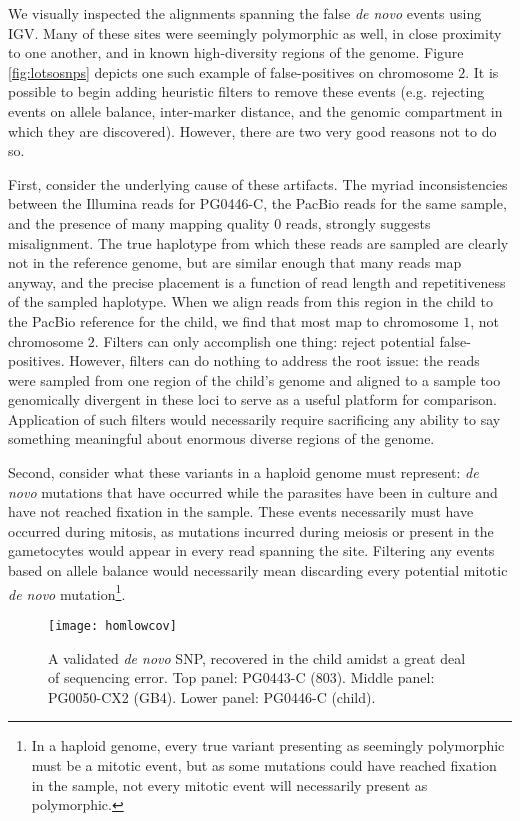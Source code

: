 We visually inspected the alignments spanning the false \textit{de novo} events using IGV.  Many of these sites were seemingly polymorphic as well, in close proximity to one another, and in known high-diversity regions of the genome.  Figure \ref{fig:lotsosnps} depicts one such example of false-positives on chromosome $2$.  It is possible to begin adding heuristic filters to remove these events (e.g. rejecting events on allele balance, inter-marker distance, and the genomic compartment in which they are discovered).  However, there are two very good reasons not to do so.

First, consider the underlying cause of these artifacts.  The myriad inconsistencies between the Illumina reads for PG0446-C, the PacBio reads for the same sample, and the presence of many mapping quality $0$ reads, strongly suggests misalignment.  The true haplotype from which these reads are sampled are clearly not in the reference genome, but are similar enough that many reads map anyway, and the precise placement is a function of read length and repetitiveness of the sampled haplotype.  When we align reads from this region in the child to the PacBio reference for the child, we find that most map to chromosome $1$, not chromosome $2$.  Filters can only accomplish one thing: reject potential false-positives.  However, filters can do nothing to address the root issue: the reads were sampled from one region of the child's genome and aligned to a sample too genomically divergent in these loci to serve as a useful platform for comparison.  Application of such filters would necessarily require sacrificing any ability to say something meaningful about enormous diverse regions of the genome.

Second, consider what these variants in a haploid genome must represent: \textit{de novo} mutations that have occurred while the parasites have been in culture and have not reached fixation in the sample.  These events necessarily must have occurred during mitosis, as mutations incurred during meiosis or present in the gametocytes would appear in every read spanning the site.  Filtering any events based on allele balance would necessarily mean discarding every potential mitotic \textit{de novo} mutation\footnote{In a haploid genome, every true variant presenting as seemingly polymorphic must be a mitotic event, but as some mutations could have reached fixation in the sample, not every mitotic event will necessarily present as polymorphic.}.

\begin{sidewaysfigure}[h!]
  \centering
    \texttt{[image: homlowcov]}
  \caption{A validated \textit{de novo} SNP, recovered in the child amidst a great deal of sequencing error.  Top panel: PG0443-C (803).  Middle panel: PG0050-CX2 (GB4).  Lower panel: PG0446-C (child).}
  \label{fig:homlowcov}
\end{sidewaysfigure}


